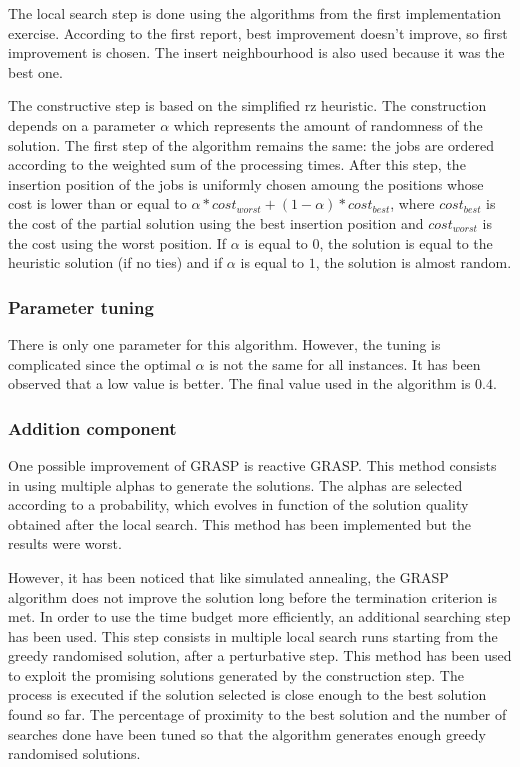 \documentclass{article}
\begin{document}
The local search step is done using the algorithms from the first implementation exercise.
According to the first report, best improvement doesn't improve, so first improvement is chosen.
The insert neighbourhood is also used because it was the best one.\newline

The constructive step is based on the simplified rz heuristic.
The construction depends on a parameter $\alpha$ which represents the amount of randomness of the solution.
The first step of the algorithm remains the same: the jobs are ordered according to the weighted sum of the processing times.
After this step, the insertion position of the jobs is uniformly chosen amoung the positions whose cost is lower than or equal to $\alpha*cost_{worst} + (1-\alpha)*cost_{best}$, where $cost_{best}$ is the cost of the partial solution using the best insertion position and $cost_{worst}$ is the cost using the worst position.
If $\alpha$ is equal to $0$, the solution is equal to the heuristic solution (if no ties) and if $\alpha$ is equal to $1$, the solution is almost random.

\subsubsection{Parameter tuning}

There is only one parameter for this algorithm.
However, the tuning is complicated since the optimal $\alpha$ is not the same for all instances.
It has been observed that a low value is better.
The final value used in the algorithm is $0.4$.

\subsubsection{Addition component}

One possible improvement of GRASP is reactive GRASP.
This method consists in using multiple alphas to generate the solutions.
The alphas are selected according to a probability, which evolves in function of the solution quality obtained after the local search.
This method has been implemented but the results were worst.\newline

However, it has been noticed that like simulated annealing, the GRASP algorithm does not improve the solution long before the termination criterion is met.
In order to use the time budget more efficiently, an additional searching step has been used.
This step consists in multiple local search runs starting from the greedy randomised solution, after a perturbative step.
This method has been used to exploit the promising solutions generated by the construction step.
The process is executed if the solution selected is close enough to the best solution found so far.
The percentage of proximity to the best solution and the number of searches done have been tuned so that the algorithm generates enough greedy randomised solutions.\newline
\end{document}
